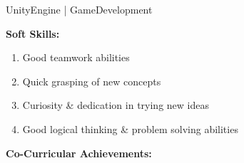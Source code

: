 \documentclass[11pt]{article}
\begin{document}
\begin{center}
\begin{minipage}[t]{0.65\textwidth}
\begin{LARGE}
{\begin{enumerate}
						UnityEngine | GameDevelopment
					\end{enumerate}
				}
			\end{LARGE}								
		\end{minipage}
		\linebreak\linebreak\linebreak
		\begin{minipage}[t]{0.35\textwidth}
			\raggedright\smallskip
			\begin{LARGE}
				\textbf{Soft Skills:}\medskip%
				{\small
					\begin{enumerate}[label=(\roman*)]
						\item Good teamwork abilities
						\item Quick grasping of new concepts
						\item Curiosity \& dedication in trying new ideas
						\item Good logical thinking \& problem solving abilities
					\end{enumerate}
				}
			\end{LARGE}
		\end{minipage}%
		\begin{minipage}[t]{0.65\textwidth}
			\raggedright\smallskip
			\begin{LARGE}
				\textbf{Co-Curricular Achievements:}\medskip%
			\end{LARGE}								
		\end{minipage}
	\end{center}
\end{document}
